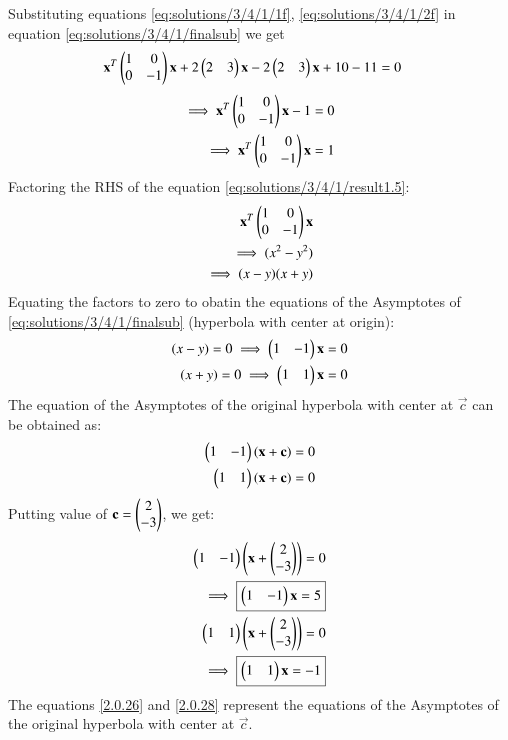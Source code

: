 \documentclass[journal,12pt,twocolumn]{IEEEtran}
\begin{document}
Substituting equations \eqref{eq:solutions/3/4/1/1f}, \eqref{eq:solutions/3/4/1/2f} in equation \eqref{eq:solutions/3/4/1/finalsub} we get 
\begin{align}
    \mathbf{x}^T\begin{pmatrix}1&0\\0&-1\end{pmatrix}\mathbf{x}+2\begin{pmatrix}2&3\end{pmatrix}\mathbf{x}-2\begin{pmatrix}2&3\end{pmatrix}\mathbf{x}+10-11&=0
\end{align}
\begin{align}
    \implies\mathbf{x}^T\begin{pmatrix}1&0\\0&-1\end{pmatrix}\mathbf{x}-1&=0\label{eq:solutions/3/4/1/result1}\\
    \implies\mathbf{x}^T\begin{pmatrix}1&0\\0&-1\end{pmatrix}\mathbf{x}&=1 \label{eq:solutions/3/4/1/result1.5}
\end{align}
Factoring the RHS of the equation \ref{eq:solutions/3/4/1/result1.5}:
\begin{align}
    \mathbf{x}^T\begin{pmatrix}1&0\\0&-1\end{pmatrix}\mathbf{x}&\\
    \implies (x^2-y^2)\\
     \implies (x-y)(x+y) \label{eq:solutions/3/4/1/result2}
\end{align}
Equating the factors to zero to obatin the equations of the Asymptotes of \ref{eq:solutions/3/4/1/finalsub} (hyperbola with center at origin):
\begin{align}
    (x-y)=0 \implies \myvec{1 &-1}\Vec{x}=0\\
    (x+y)=0 \implies \myvec{1 & 1}\Vec{x}=0
\end{align}
The equation of the Asymptotes of the original hyperbola with center at $\Vec{c}$ can be obtained as:
\begin{align}
    \begin{pmatrix}1 &-1\end{pmatrix}(\mathbf{x}+\mathbf{c})=0\\
    \begin{pmatrix}1 & 1\end{pmatrix}(\mathbf{x}+\mathbf{c})=0
\end{align}
Putting value of $\mathbf{c}=\begin{pmatrix}2\\-3\end{pmatrix}$, we get:
\begin{align}
    \myvec{1 &-1}\brak{\vec{x}+\myvec{2 \\-3}}=0\\
    \implies \boxed{\myvec{1 &-1}\Vec{x}=5} \label{2.0.26}\\
    \myvec{1 & 1}\brak{\vec{x}+\myvec{2 \\-3}}=0\\
     \implies \boxed{\myvec{1 &1}\Vec{x}=-1} \label{2.0.28}
\end{align}
The equations \ref{2.0.26} and \ref{2.0.28} represent the equations of the Asymptotes of the original hyperbola with center at $\Vec{c}$.
\end{document}
